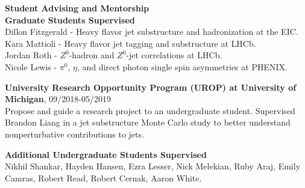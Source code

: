 \documentclass[11pt]{article}
\begin{document}




\begin{flushleft}
\LARGE \textbf{Student Advising and Mentorship}\\
\normalsize
\vspace{0.3cm}
\textbf{Graduate Students Supervised}\\
Dillon Fitzgerald - Heavy flavor jet substructure and hadronization at the EIC. \\
Kara Mattioli - Heavy flavor jet tagging and substructure at LHCb. \\
Jordan Roth - $Z^0$-hadron and $Z^0$-jet correlations at LHCb. \\
Nicole Lewis - $\pi^0$, $\eta$, and direct photon single spin asymmetries at PHENIX. \\

\vspace{0.5cm}

\textbf{University Research Opportunity Program (UROP) at University of Michigan}, 09/2018-05/2019\\
Propose and guide a research project to an undergraduate student. Supervised Brandon Liang in a jet substructure Monte Carlo study to better understand nonperturbative contributions to jets.\\
\vspace*{0.3cm}

\textbf{Additional Undergraduate Students Supervised}\\
Nikhil Shankar, Hayden Hansen, Ezra Lesser, Nick Melekian, Ruby Araj, Emily Camras, Robert Read, Robert Cernak, Aaron White.
\end{flushleft}
\end{document}
